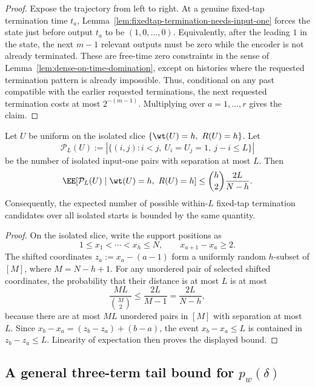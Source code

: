 \begin{proof}
Expose the trajectory from left to right. At a genuine fixed-tap termination time \(t_a\),
Lemma~\ref{lem:fixedtap-termination-needs-input-one} forces the state just before output \(t_a\) to be
\((1,0,\dots,0)\). Equivalently, after the leading \(1\) in the state, the next \(m-1\) relevant outputs must be zero
while the encoder is not already terminated. These are free-time zero constraints in the sense of
Lemma~\ref{lem:dense-on-time-domination}, except on histories where the requested termination pattern is already
impossible. Thus, conditional on any past compatible with the earlier requested terminations, the next requested
termination costs at most \(2^{-(m-1)}\). Multiplying over \(a=1,\dots,r\) gives the claim.
\end{proof}

\begin{corollary}
\label{cor:fixedtap-isolated-pair-candidates}
Let \(U\) be uniform on the isolated slice \(\{\wt(U)=h,\ R(U)=h\}\). Let
\[
\mathcal{P}_L(U)
:=
|\{(i,j): i<j,\ U_i=U_j=1,\ j-i\le L\}|
\]
be the number of isolated input-one pairs with separation at most \(L\). Then
\[
\EE[\mathcal{P}_L(U)\mid \wt(U)=h,\ R(U)=h]
\le
\binom{h}{2}\frac{2L}{N-h}.
\]
Consequently, the expected number of possible within-\(L\) fixed-tap termination candidates over all isolated starts is
bounded by the same quantity.
\end{corollary}

\begin{proof}
On the isolated slice, write the support positions as
\[
1\le x_1<\cdots<x_h\le N,
\qquad x_{a+1}-x_a\ge 2.
\]
The shifted coordinates \(z_a:=x_a-(a-1)\) form a uniformly random \(h\)-subset of \([M]\), where \(M=N-h+1\). For any
unordered pair of selected shifted coordinates, the probability that their distance is at most \(L\) is at most
\[
\frac{ML}{\binom{M}{2}}\le \frac{2L}{M-1}=\frac{2L}{N-h},
\]
because there are at most \(ML\) unordered pairs in \([M]\) with separation at most \(L\). Since
\(x_b-x_a=(z_b-z_a)+(b-a)\), the event \(x_b-x_a\le L\) is contained in \(z_b-z_a\le L\). Linearity of expectation
then proves the displayed bound.
\end{proof}

\subsection{A general three-term tail bound for $p_w(\delta)$}
\label{subsec:inner-dense-three-term}


